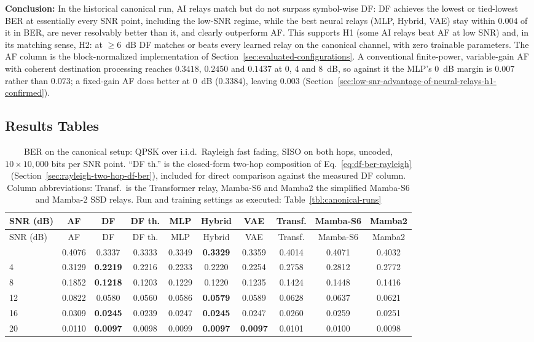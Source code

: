 \textbf{Conclusion:} In the historical canonical run, AI relays match but do not surpass symbol-wise DF: DF achieves the lowest or tied-lowest BER at essentially every SNR point, including the low-SNR regime, while the best neural relays (MLP, Hybrid, VAE) stay within $0.004$ of it in BER, are never resolvably better than it, and clearly outperform AF. This supports H1 (some AI relays beat AF at low SNR) and, in its matching sense, H2: at $\geq 6$~dB DF matches or beats every learned relay on the canonical channel, with zero trainable parameters. The AF column is the block-normalized implementation of Section~\ref{sec:evaluated-configurations}. A conventional finite-power, variable-gain AF with coherent destination processing reaches $0.3418$, $0.2450$ and $0.1437$ at 0, 4 and 8~dB, so against it the MLP's 0~dB margin is $0.007$ rather than $0.073$; a fixed-gain AF does better at 0~dB ($0.3384$), leaving $0.003$ (Section~\ref{sec:low-snr-advantage-of-neural-relays-h1-confirmed}).

\subsection{Results Tables}\label{sec:results-tables}

\begingroup\footnotesize
\begin{longtable}[]{@{}lccccccccc@{}}
\caption[BER on the canonical setup]{BER on the canonical setup: QPSK over i.i.d.\ Rayleigh fast fading, SISO on both hops, uncoded, $10\times10{,}000$ bits per SNR point. ``DF th.'' is the closed-form two-hop composition of Eq.~\ref{eq:df-ber-rayleigh} (Section~\ref{sec:rayleigh-two-hop-df-ber}), included for direct comparison against the measured DF column. Column abbreviations: Transf.\ is the Transformer relay, Mamba-S6 and Mamba2 the simplified Mamba-S6 and Mamba-2 SSD relays. Run and training settings as executed: Table~\ref{tbl:canonical-runs}}\label{tbl:table2}\tabularnewline
\toprule\noalign{}
SNR (dB) & AF & DF & DF th. & MLP & Hybrid & VAE & Transf. & Mamba-S6 & Mamba2 \\
\midrule\noalign{}
\endfirsthead
\toprule\noalign{}
SNR (dB) & AF & DF & DF th. & MLP & Hybrid & VAE & Transf. & Mamba-S6 & Mamba2 \\
\midrule\noalign{}
\endhead
\bottomrule\noalign{}
\endlastfoot
0 & 0.4076 & 0.3337 & 0.3333 & 0.3349 & \textbf{0.3329} & 0.3359 & 0.4014 & 0.4071 & 0.4032 \\
4 & 0.3129 & \textbf{0.2219} & 0.2216 & 0.2233 & 0.2220 & 0.2254 & 0.2758 & 0.2812 & 0.2772 \\
8 & 0.1852 & \textbf{0.1218} & 0.1203 & 0.1229 & 0.1220 & 0.1235 & 0.1424 & 0.1448 & 0.1416 \\
12 & 0.0822 & 0.0580 & 0.0560 & 0.0586 & \textbf{0.0579} & 0.0589 & 0.0628 & 0.0637 & 0.0621 \\
16 & 0.0309 & \textbf{0.0245} & 0.0239 & 0.0247 & \textbf{0.0245} & 0.0247 & 0.0260 & 0.0259 & 0.0251 \\
20 & 0.0110 & \textbf{0.0097} & 0.0098 & 0.0099 & \textbf{0.0097} & \textbf{0.0097} & 0.0101 & 0.0100 & 0.0098 \\
\end{longtable}
\endgroup

